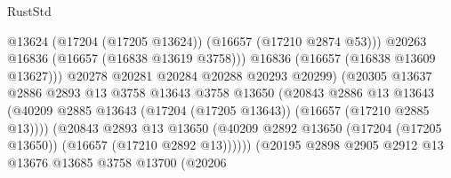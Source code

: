 \begin{lexlean}{RustStd}
\begin{coremodule}
                                              @13624
                                              (@17204 (@17205 @13624))
                                              (@16657 (@17210 @2874 @53)))
                                            @20263
                                            @16836
                                            (@16657 (@16838 @13619 @3758)))
                                          @16836
                                          (@16657 (@16838 @13609 @13627)))
                                        @20278
                                        @20281
                                        @20284
                                        @20288
                                        @20293
                                        @20299)
                                      (@20305
                                        @13637
                                        @2886
                                        @2893
                                        @13
                                        @3758
                                        @13643
                                        @3758
                                        @13650
                                        (@20843
                                          @2886
                                          @13
                                          @13643
                                          (@40209
                                            @2885
                                            @13643
                                            (@17204 (@17205 @13643))
                                            (@16657 (@17210 @2885 @13))))
                                        (@20843
                                          @2893
                                          @13
                                          @13650
                                          (@40209
                                            @2892
                                            @13650
                                            (@17204 (@17205 @13650))
                                            (@16657 (@17210 @2892 @13))))))
                                    (@20195
                                      @2898
                                      @2905
                                      @2912
                                      @13
                                      @13676
                                      @13685
                                      @3758
                                      @13700
                                      (@20206

\end{coremodule}
\end{lexlean}

